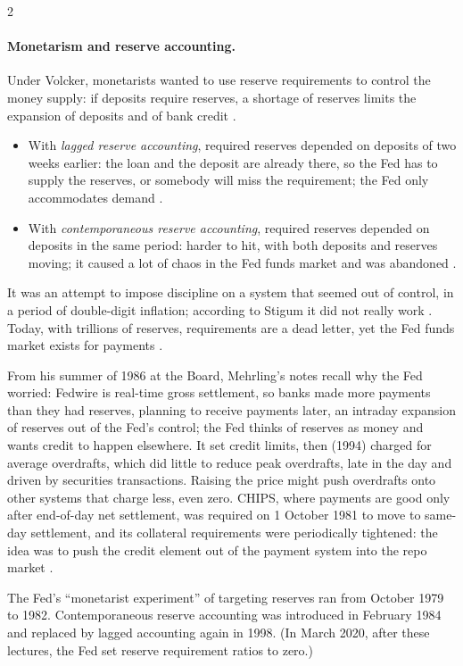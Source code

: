 \begin{paracol}{2}
\paragraph{Monetarism and reserve accounting.} Under Volcker, monetarists wanted to use reserve requirements to control the money supply: if deposits require
reserves, a shortage of reserves limits the expansion of deposits and of bank credit .
\begin{itemize}
  \item With \emph{lagged reserve accounting}, required reserves depended on deposits of two weeks earlier: the loan and the deposit are already there, so the
        Fed has to supply the reserves, or somebody will miss the requirement; the Fed only accommodates demand .
  \item With \emph{contemporaneous reserve accounting}, required reserves depended on deposits in the same period: harder to hit, with both deposits and
        reserves moving; it caused a lot of chaos in the Fed funds market and was abandoned .
\end{itemize}
It was an attempt to impose discipline on a system that seemed out of control, in a period of double-digit inflation; according to Stigum it did not really work
. Today, with trillions of reserves, requirements are a dead letter, yet the Fed funds market exists for payments .

\begin{aside}
From his summer of 1986 at the Board, Mehrling's notes recall why the Fed worried: Fedwire is real-time gross settlement, so banks made more payments than they had
reserves, planning to receive payments later, an intraday expansion of reserves out of the Fed's control; the Fed thinks of reserves as money and wants credit to
happen elsewhere. It set credit limits, then (1994) charged for average overdrafts, which did little to reduce peak overdrafts, late in the day and driven by securities
transactions. Raising the price might push overdrafts onto other systems that charge less, even zero. CHIPS, where payments are good only after end-of-day net
settlement, was required on 1 October 1981 to move to same-day settlement, and its collateral requirements were periodically tightened: the idea was to push the credit
element out of the payment system into the repo market .
\end{aside}

\begin{coursenote}[Dates]
The Fed's ``monetarist experiment'' of targeting reserves ran from October 1979 to 1982. Contemporaneous reserve accounting was introduced in February 1984 and
replaced by lagged accounting again in 1998. (In March 2020, after these lectures, the Fed set reserve requirement ratios to zero.)
\end{coursenote}


\end{paracol}
